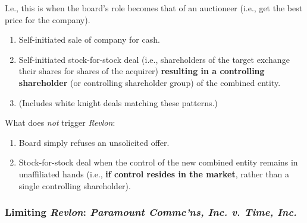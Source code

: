 I.e., this is when the board's role becomes that of an auctioneer (i.e., get  
the best price for the company).

\begin{enumerate}
    \item Self-initiated sale of company for cash.
    \item Self-initiated stock-for-stock deal (i.e., shareholders of the target 
    exchange their shares for shares of the acquirer) \textbf{resulting in a 
    controlling shareholder} (or controlling shareholder group) of the combined 
    entity.
    \item (Includes white knight deals matching these patterns.)
\end{enumerate}

What does \emph{not} trigger \emph{Revlon}:

\begin{enumerate}
    \item Board simply refuses an unsolicited offer.
    \item Stock-for-stock deal when the control of the new combined entity 
    remains in unaffiliated hands (i.e., \textbf{if control resides in the 
    market}, rather than a single controlling shareholder).
\end{enumerate}

\subsubsection{Limiting \emph{Revlon}: \emph{Paramount Commc'ns, Inc. v. Time, 
Inc.}}

